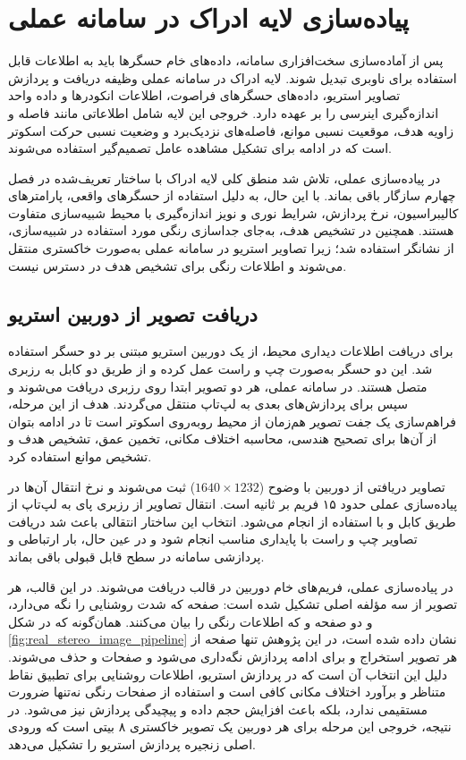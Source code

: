 \section{پیاده‌سازی لایه ادراک در سامانه عملی}
\label{sec:real_perception_layer}

پس از آماده‌سازی سخت‌افزاری سامانه، داده‌های خام حسگرها باید به اطلاعات قابل استفاده برای ناوبری تبدیل شوند. لایه ادراک در سامانه عملی وظیفه دریافت و پردازش تصاویر استریو، داده‌های حسگرهای فراصوت، اطلاعات انکودرها و داده واحد اندازه‌گیری اینرسی را بر عهده دارد. خروجی این لایه شامل اطلاعاتی مانند فاصله و زاویه هدف، موقعیت نسبی موانع، فاصله‌های نزدیک‌برد و وضعیت نسبی حرکت اسکوتر است که در ادامه برای تشکیل مشاهده عامل تصمیم‌گیر استفاده می‌شوند.

در پیاده‌سازی عملی، تلاش شد منطق کلی لایه ادراک با ساختار تعریف‌شده در فصل چهارم سازگار باقی بماند. با این حال، به دلیل استفاده از حسگرهای واقعی، پارامترهای کالیبراسیون، نرخ پردازش، شرایط نوری و نویز اندازه‌گیری با محیط شبیه‌سازی متفاوت هستند. همچنین در تشخیص هدف، به‌جای جداسازی رنگی مورد استفاده در شبیه‌سازی، از نشانگر  استفاده شد؛ زیرا تصاویر استریو در سامانه عملی به‌صورت خاکستری منتقل می‌شوند و اطلاعات رنگی برای تشخیص هدف در دسترس نیست.

\subsection{دریافت تصویر از دوربین استریو}
\label{subsec:real_stereo_image_acquisition}

برای دریافت اطلاعات دیداری محیط، از یک دوربین استریو مبتنی بر دو حسگر  استفاده شد. این دو حسگر به‌صورت چپ و راست عمل کرده و از طریق دو کابل  به رزبری متصل هستند. در سامانه عملی، هر دو تصویر ابتدا روی رزبری دریافت می‌شوند و سپس برای پردازش‌های بعدی به لپ‌تاپ منتقل می‌گردند. هدف از این مرحله، فراهم‌سازی یک جفت تصویر هم‌زمان از محیط روبه‌روی اسکوتر است تا در ادامه بتوان از آن‌ها برای تصحیح هندسی، محاسبه اختلاف مکانی، تخمین عمق، تشخیص هدف و تشخیص موانع استفاده کرد.

تصاویر دریافتی از دوربین با وضوح ($1640 \times 1232$) ثبت می‌شوند و نرخ انتقال آن‌ها در پیاده‌سازی عملی حدود ۱۵ فریم بر ثانیه است. انتقال تصاویر از رزبری پای به لپ‌تاپ از طریق کابل  و با استفاده از  انجام می‌شود. انتخاب این ساختار انتقالی باعث شد دریافت تصاویر چپ و راست با پایداری مناسب انجام شود و در عین حال، بار ارتباطی و پردازشی سامانه در سطح قابل قبولی باقی بماند.

در پیاده‌سازی عملی، فریم‌های خام دوربین در قالب  دریافت می‌شوند. در این قالب، هر تصویر از سه مؤلفه اصلی تشکیل شده است: صفحه  که شدت روشنایی را نگه می‌دارد، و دو صفحه  و  که اطلاعات رنگی را بیان می‌کنند. همان‌گونه که در شکل \ref{fig:real_stereo_image_pipeline} نشان داده شده است، در این پژوهش تنها صفحه  از هر تصویر استخراج و برای ادامه پردازش نگه‌داری می‌شود و صفحات  و  حذف می‌شوند. دلیل این انتخاب آن است که در پردازش استریو، اطلاعات روشنایی برای تطبیق نقاط متناظر و برآورد اختلاف مکانی کافی است و استفاده از صفحات رنگی نه‌تنها ضرورت مستقیمی ندارد، بلکه باعث افزایش حجم داده و پیچیدگی پردازش نیز می‌شود. در نتیجه، خروجی این مرحله برای هر دوربین یک تصویر خاکستری ۸ بیتی است که ورودی اصلی زنجیره پردازش استریو را تشکیل می‌دهد.

